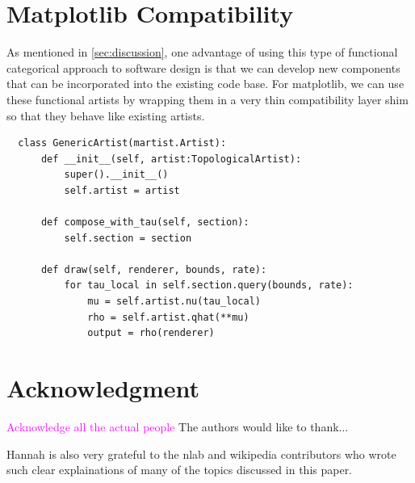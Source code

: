 \documentclass[journal]{IEEEtran}
\newcommand{\note}[1]{\textcolor{magenta}{#1}}
\theoremstyle{definition}
\theoremstyle{remark}
\begin{document}
\pagebreak
\section{Matplotlib Compatibility}
\label{sec:appendix:artist_shim}

As mentioned in \autoref{sec:discussion}, one advantage of using this type of
functional categorical approach to software design is that we can develop new
components that can be incorporated into the existing code base. For matplotlib,
we can use these functional artists by wrapping them in a very thin compatibility
layer shim so that they behave like existing artists.

\begin{verbatim}
  class GenericArtist(martist.Artist):
      def __init__(self, artist:TopologicalArtist):
          super().__init__()
          self.artist = artist

      def compose_with_tau(self, section):
          self.section = section

      def draw(self, renderer, bounds, rate):
          for tau_local in self.section.query(bounds, rate):
              mu = self.artist.nu(tau_local)
              rho = self.artist.qhat(**mu)
              output = rho(renderer)
  \end{verbatim}

\section*{Acknowledgment}
\note{Acknowledge all the actual people}
The authors would like to thank...

Hannah is also very grateful to the nlab and wikipedia contributors who wrote such
clear explainations of many of the topics discussed in this paper.

\ifCLASSOPTIONcaptionsoff
  \newpage
\fi



\printbibliography

\end{document}
